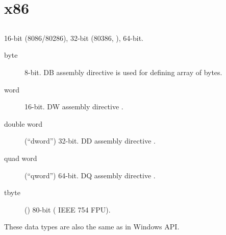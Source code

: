 \section{x86}

\subsection{}

 16-bit (8086/80286), 32-bit (80386, ), 64-bit.

\begin{description}
	\item[byte] 8-bit. 
		{DB assembly directive is used for defining array of bytes}.
	\item[word] 16-bit. 
		{DW assembly directive \dittoclosing{}}.
	\item[double word] (``dword'') 32-bit. 
		{DD assembly directive \dittoclosing{}}.
	\item[quad word] (``qword'') 64-bit. 
		{DQ assembly directive \dittoclosing{}}.
	\item[tbyte] () 80-bit   
		( IEEE 754 FPU).
\end{description}

{These data types are also the same as in} Windows \ac{API}.

